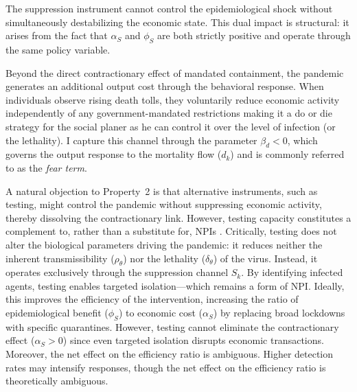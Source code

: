 \documentclass[12pt, a4paper]{article}
\begin{document}
The suppression instrument cannot control the epidemiological shock without simultaneously destabilizing the economic state. This dual impact is structural: it arises from the fact that $\alpha_S$ and $\phi_S$ are both strictly positive and operate through the same policy variable.
 
Beyond the direct contractionary effect of mandated containment, the pandemic generates an additional output cost through the behavioral response. When individuals observe rising death tolls, they voluntarily reduce economic activity independently of any government-mandated restrictions \citep{GOOLSBEE2021} making it a do or die strategy for the social planer as he can control it over the level of infection (or the lethality). I capture this channel through the parameter $\beta_d < 0$, which governs the output response to the mortality flow ($d_k$) and is commonly referred to as the \textit{fear term}. %

A natural objection to Property~2 is that alternative instruments, such as testing, might control the pandemic without suppressing economic activity, thereby dissolving the contractionary link. However, testing capacity constitutes a complement to, rather than a substitute for, NPIs \citep{repec:nbr}. Critically, testing does not alter the biological parameters driving the pandemic: it reduces neither the inherent transmissibility ($\rho_\theta$) nor the lethality ($\delta_\theta$) of the virus. Instead, it operates exclusively through the suppression channel $S_k$. By identifying infected agents, testing enables targeted isolation---which remains a form of NPI. Ideally, this improves the efficiency of the intervention, increasing the ratio of epidemiological benefit ($\phi_S$) to economic cost ($\alpha_S$) by replacing broad lockdowns with specific quarantines. However, testing cannot eliminate the contractionary effect ($\alpha_S > 0$) since even targeted isolation disrupts economic transactions. Moreover, the net effect on the efficiency ratio is ambiguous. Higher detection rates may intensify responses, though the net effect on the efficiency ratio is theoretically ambiguous. 
\end{document}
